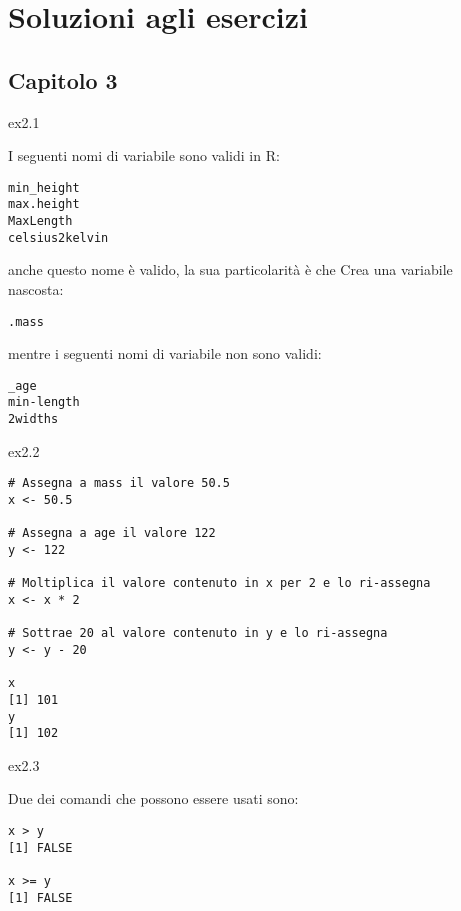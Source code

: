 \chapter{Soluzioni agli esercizi}

\section{Capitolo 3}

\begin{solution}{ex2.1}

\noindent I seguenti nomi di variabile sono validi in R:

\begin{lstlisting}[style=Rstyle]
min_height
max.height
MaxLength
celsius2kelvin
\end{lstlisting}

\noindent anche questo nome \`e valido, la sua particolarit\`a \`e che Crea una variabile nascosta:

\begin{lstlisting}[style=Rstyle]
.mass
\end{lstlisting}

\noindent mentre i seguenti nomi di variabile non sono validi:

\begin{lstlisting}[style=Rstyle]
_age
min-length
2widths
\end{lstlisting}


\end{solution}

\vspace{0.5cm}

\begin{solution}{ex2.2}

\begin{lstlisting}[style=Rstyle]
# Assegna a mass il valore 50.5
x <- 50.5    

# Assegna a age il valore 122
y <- 122     

# Moltiplica il valore contenuto in x per 2 e lo ri-assegna 
x <- x * 2   

# Sottrae 20 al valore contenuto in y e lo ri-assegna 
y <- y - 20  
	
x
[1] 101
y
[1] 102
\end{lstlisting}

\end{solution}

\vspace{0.5cm}

\begin{solution}{ex2.3}

\noindent Due dei comandi che possono essere usati sono:

\begin{lstlisting}[style=Rstyle]
x > y	
[1] FALSE

x >= y
[1] FALSE
\end{lstlisting}

\end{solution}

